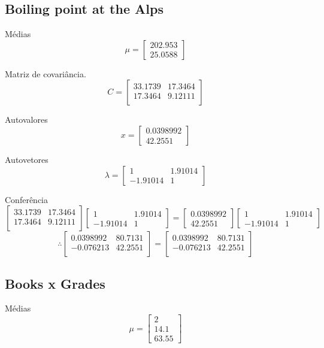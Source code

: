 \documentclass[a4paper, 11pt]{article}
\begin{document}
\subsection*{Boiling point at the Alps}
Médias
$$ \mu =
\begin{bmatrix}
202.953 \\
25.0588
\end{bmatrix}
$$

Matriz de covariância.
$$ C =
\begin{bmatrix}
33.1739&17.3464\\
17.3464&9.12111\\
\end{bmatrix}
$$

Autovalores
$$ x =
\begin{bmatrix}
0.0398992\\
42.2551
\end{bmatrix}
$$

Autovetores
$$ \lambda =
\begin{bmatrix}
1&1.91014\\
-1.91014&1
\end{bmatrix}
$$

Conferência
$$
\begin{bmatrix}
33.1739&17.3464\\
17.3464&9.12111\\
\end{bmatrix}
\begin{bmatrix}
1&1.91014\\
-1.91014&1
\end{bmatrix}
=
\begin{bmatrix}
0.0398992\\
42.2551
\end{bmatrix}
\begin{bmatrix}
1&1.91014\\
-1.91014&1
\end{bmatrix}
$$
$$
\therefore
\begin{bmatrix}
0.0398992&80.7131\\
-0.076213&42.2551\\
\end{bmatrix}
=
\begin{bmatrix}
0.0398992&80.7131\\
-0.076213&42.2551\\
\end{bmatrix}
$$


\subsection*{Books x Grades}
Médias
$$ \mu =
\begin{bmatrix}
2 \\
14.1 \\
63.55
\end{bmatrix}
$$
\end{document}
